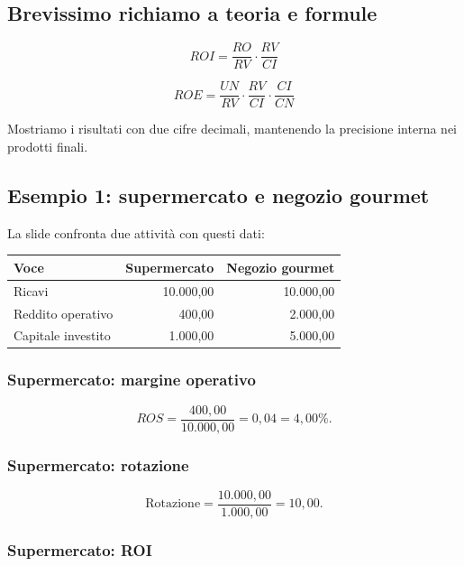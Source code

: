\subsection*{Brevissimo richiamo a teoria e formule}

\[
\boxed{
ROI=
\frac{RO}{RV}
\cdot
\frac{RV}{CI}
}
\]

\[
\boxed{
ROE=
\frac{UN}{RV}
\cdot
\frac{RV}{CI}
\cdot
\frac{CI}{CN}
}
\]

\noindent Mostriamo i risultati
con due cifre decimali,
mantenendo la precisione interna
nei prodotti finali.


\subsection*{Esempio 1:
supermercato e negozio gourmet}

\noindent La slide confronta
due attività con questi dati:

\begin{center}
    \begin{tabular}{|l|r|r|}
        \hline
        \textbf{Voce}
        & \textbf{Supermercato}
        & \textbf{Negozio gourmet} \\
        \hline
        Ricavi & 10.000,00 & 10.000,00 \\
        Reddito operativo & 400,00 & 2.000,00 \\
        Capitale investito & 1.000,00 & 5.000,00 \\
        \hline
    \end{tabular}
\end{center}


\subsubsection*{Supermercato: margine operativo}

\[
ROS=
\frac{400{,}00}{10.000{,}00}
=
0{,}04
=
\boxed{4{,}00\%}.
\]


\subsubsection*{Supermercato: rotazione}

\[
\text{Rotazione}
=
\frac{10.000{,}00}{1.000{,}00}
=
\boxed{10{,}00}.
\]


\subsubsection*{Supermercato: ROI}

